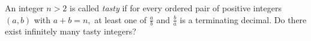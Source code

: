 An integer $n>2$ is called \textit{tasty} if for every ordered pair of positive integers $(a,b)$ with $a+b=n,$ at least one of $\frac{a}{b}$ and $\frac{b}{a}$ is a terminating decimal. Do there exist infinitely many tasty integers?

